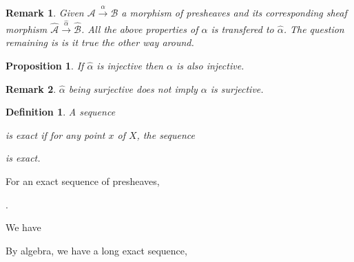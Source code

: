 \documentclass{article}
\newtheorem{proposition}{Proposition}[section]
\newtheorem{definition}{Definition}[section]
\newtheorem{remark}{Remark}[section]
\newcommand{\cA}[0]{\mathcal{A}}
\newcommand{\cB}[0]{\mathcal{B}}
\newcommand{\cC}[0]{\mathcal{C}}
\newcommand{\sU}[0]{\mathscr{U}}
\begin{document}
\begin{remark}
  Given $\cA\stackrel{\alpha}{\to}\cB$ a morphism of presheaves and its corresponding sheaf morphism $\hat{\cA}\stackrel{\hat{\alpha}}{\to}\hat{\cB}$. All the above properties of $\alpha$ is transfered to $\hat{\alpha}$. The question remaining is is it true the other way around. 
\end{remark}

\begin{proposition}
  If $\hat{\alpha}$ is injective then $\alpha$ is also injective.
  \label{proposition_gamma_left_exact}
\end{proposition}

\begin{remark}
  $\hat{\alpha}$ being surjective does not imply $\alpha$ is surjective.
  \label{remark_gamma_left_exact}
\end{remark}

\begin{definition}
  A sequence 
  \begin{center}
  \end{center}
  is exact if for any point $x$ of $X$, the sequence 
  \begin{center}
  \end{center}
  is exact.
\end{definition}

For an exact sequence of presheaves,
\begin{center}
  \end{center}.

  We have 
  \begin{center}
  \end{center}

  By algebra, we have a long exact sequence,
  \begin{center}
  \end{center}
\end{document}
